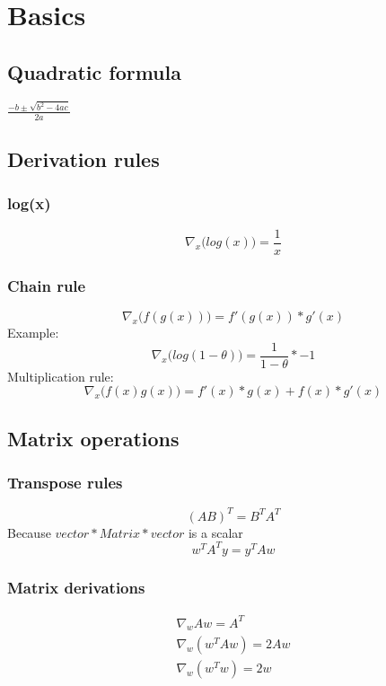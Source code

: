 \section{Basics}
\subsection{Quadratic formula}
$\frac{-b \pm \sqrt{b^{2}-4ac}}{2a}$
\subsection{Derivation rules}
\subsubsection{log(x)}
\begin{equation}
	\nabla_{x}\big( log(x) \big) = \frac{1}{x}
\end{equation}
\subsubsection{Chain rule}
\begin{equation}
	\nabla_{x}\big( f(g(x)) \big) = f'(g(x))*g'(x)
\end{equation}
Example:
\begin{equation}
	\nabla_{x}\big( log(1-\theta) \big) = \frac{1}{1-\theta}*- 1
\end{equation}
Multiplication rule:
\begin{equation}
	\nabla_{x}\big( f(x)g(x) \big) = f'(x)*g(x) + f(x)*g'(x)
\end{equation}
\subsection{Matrix operations}
\subsubsection{Transpose rules}
\begin{equation}
	(AB)^{T}= B^{T}A^{T}
\end{equation}
Because $vector * Matrix * vector$ is a scalar
\begin{equation}
	w^{T}A^{T}y = y^{T}Aw
\end{equation}
\subsubsection{Matrix derivations}
\begin{equation}
	\begin{aligned}
		\nabla_{w}Aw = A^T\\ \nabla_w(w^{T}Aw) = 2Aw\\ \nabla_w(w^{T}w) = 2w\\
	\end{aligned}
\end{equation}